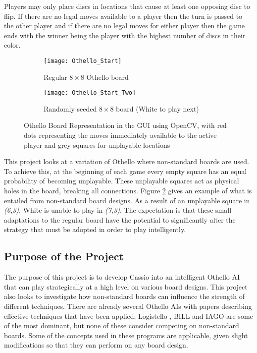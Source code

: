 \documentclass[12pt,a4paper]{article}
\begin{document}
Players may only place discs in locations that cause at least one opposing disc to flip. If there are no legal moves available to a player then the turn is passed to the other player and if there are no legal moves for either player then the game ends with the winner being the player with the highest number of discs in their color.

\begin{figure}[ht]
\captionsetup{justification=centering}
\centering
\begin{subfigure}{.5\textwidth}
  \centering
  \texttt{[image: Othello\_Start]}
  \caption{Regular $8\times8$ Othello board}
  \label{fig:regular_othello_board}
\end{subfigure}%
\begin{subfigure}{.5\textwidth}
  \centering
  \texttt{[image: Othello\_Start\_Two]}
  \caption{Randomly seeded $8\times8$ board (White to play next)}
  \label{fig:random_othello_board}
\end{subfigure}
\caption{Othello Board Representation in the GUI using OpenCV, with red dots representing the moves immediately available to the active player and grey squares for unplayable locations}
\label{fig:othello_board_variations}
\end{figure}

This project looks at a variation of Othello where non-standard boards are used. To achieve this, at the beginning of each game every empty square has an equal probability of becoming unplayable. These unplayable squares act as physical holes in the board, breaking all connections. Figure \ref{fig:random_othello_board} gives an example of what is entailed from non-standard board designs. As a result of an unplayable square in \textit{(6,3)}, White is unable to play in \textit{(7,3)}. The expectation is that these small adaptations to the regular board have the potential to significantly alter the strategy that must be adopted in order to play intelligently.

\subsection{Purpose of the Project}

The purpose of this project is to develop Cassio into an intelligent Othello AI that can play strategically at a high level on various board designs. This project also looks to investigate how non-standard boards can influence the strength of different techniques. There are already several Othello AIs with papers describing effective techniques that have been applied; Logistello \cite{buro1997evaluation}, BILL \cite{lee1990development} and IAGO \cite{rosenbloom1982world} are some of the most dominant, but none of these consider competing on non-standard boards. Some of the concepts used in these programs are applicable, given slight modifications so that they can perform on any board design.
\end{document}
